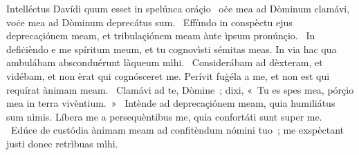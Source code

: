 { Intelléctus Davídi quum esset in spelúnca oráçio}
{%
~oċe mea ad Dòminum clamávi, voċe mea ad Dòminum deprecátus sum. 
~Effùndo in conspèctu ejus deprecaçiónem meam, et tribulaçiónem meam ànte ìpsum pronúnçio. 
~In defiċièndo e me spíritum meum, et tu cognovìsti sémitas meas. In via hac qua ambulábam absconduérunt làqueum mìhi. 
~Considerábam ad dèxteram, et vidébam, et non èrat qui cognósceret me. Perívit fuġéla a me, et non est qui requírat ànimam meam. 
~Clamávi ad te, Dòmine~; dixi, «~Tu es spes mea, pórçio mea in terra vivèntium.~»
~Intènde ad deprecaçiónem meam, quia humiliátus sum nìmis. Líbera me a persequèntibus me, quia confortáti sunt super me. 
~Edúce de custódia ànimam meam ad confitèndum nómini tuo~; me exspèctant justi donec retrìbuas mìhi. 
}
